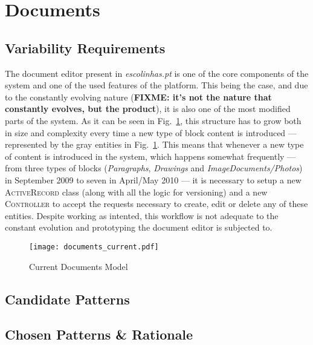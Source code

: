 \section{Documents}\label{sec:fa_documents}

\subsection{Variability Requirements}\label{sec:fa_documents_variability_requirements}

The document editor present in \emph{escolinhas.pt} is one of the core components of the system and one of the used features of the platform. This being the case, and due to the constantly evolving nature (\textbf{FIXME: it's not the nature that constantly evolves, but the product}), it is also one of the most modified parts of the system. As it can be seen in Fig.~\ref{fig:documents_current}, this structure has to grow both in size and complexity every time a new type of block content is introduced --- represented by the gray entities in Fig.~\ref{fig:documents_current}. This means that whenever a new type of content is introduced in the system, which happens somewhat frequently --- from three types of blocks (\emph{Paragraphs}, \emph{Drawings} and \emph{ImageDocuments/Photos}) in September 2009 to seven in April/May 2010 --- it is necessary to setup a new \textsc{ActiveRecord} class (along with all the logic for versioning) and a new \textsc{Controller} to accept the requests necessary to create, edit or delete any of these entities. Despite working as intented, this workflow is not adequate to the constant evolution and prototyping the document editor is subjected to.

\begin{figure}[H]
  \centering
  \texttt{[image: documents\_current.pdf]}
  \caption{Current Documents Model}
  \label{fig:documents_current}
\end{figure}

\subsection{Candidate Patterns}\label{sec:fa_documents_candidate_patterns}

\subsection{Chosen Patterns \& Rationale}\label{sec:fa_documents_chosen_patterns_rationale}

